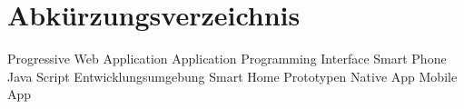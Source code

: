 \chapter*{Abkürzungsverzeichnis}
\pagestyle{plain}

\begin{acronym}[AUTOSAR]

   				{Progressive Web Application}
  				{Application Programming Interface}
  				{Smart Phone}
  				{Java Script}
  				{Entwicklungsumgebung}
  				{Smart Home Prototypen}
  				{Native App}
  				{Mobile App}
\end{acronym}